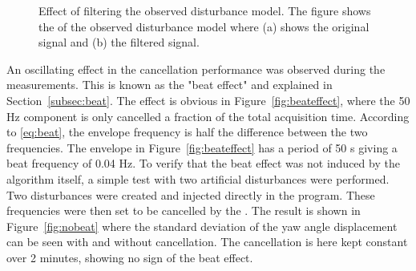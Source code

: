 \begin{figure}[h!]
  \centering %
  \qquad
  \caption{\label{fig:bandpass_imp} Effect of filtering the observed disturbance model. The figure shows the \abbrFFT of the observed disturbance model where (a) shows the original signal and (b) the filtered signal.}
\end{figure}
\FloatBarrier
An oscillating effect in the cancellation performance was observed during the measurements. This is known as the "beat effect" and explained in Section~\ref{subsec:beat}. The effect is obvious in Figure~\ref{fig:beateffect}, where the 50 Hz component is only cancelled a fraction of the total acquisition time. According to \eqref{eq:beat}, the envelope frequency is half the difference between the two frequencies. The envelope in Figure~\ref{fig:beateffect} has a period of 50 s giving a beat frequency of 0.04 Hz. To verify that the beat effect was not induced by the algorithm itself, a simple test with two artificial disturbances were performed. Two disturbances were created and injected directly in the program. These frequencies were then set to be cancelled by the \abbrRFDC. The result is shown in Figure~\ref{fig:nobeat} where the standard deviation of the yaw angle displacement can be seen with and without cancellation. The cancellation is here kept constant over 2 minutes, showing no sign of the beat effect.

